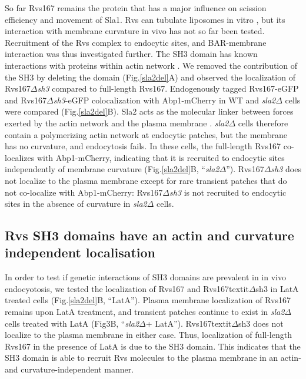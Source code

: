 \documentclass[9pt,lineno]{elife}
\begin{document}
So far Rvs167 remains the protein that has a major influence on scission efficiency and movement of Sla1. Rvs can tubulate liposomes in vitro \citep{Youn2010}, but its interaction with membrane curvature in vivo has not so far been tested.  Recruitment of the Rvs complex to endocytic sites, and BAR-membrane interaction was thus investigated further. The SH3 domain has known interactions with proteins within actin network \citep{Lila1997,Colwill1999,Madania1999,Liu2009}. We removed the contribution of the SH3 by deleting the domain (Fig.\ref{sla2del}A) and observed the localization of Rvs167\textit{$\Delta$sh3} compared to full-length Rvs167. Endogenously tagged Rvs167-eGFP and Rvs167\textit{$\Delta$sh3}-eGFP colocalization with Abp1-mCherry in WT and \textit{sla2$\Delta$} cells were compared (Fig.\ref{sla2del}B). Sla2 acts as the molecular linker between forces exerted by the actin network and the plasma membrane \citep{Skruzny2012}. \textit{sla2$\Delta$} cells therefore contain a polymerizing actin network at endocytic patches, but the membrane has no curvature, and endocytosis fails. In these cells, the full-length Rvs167 co-localizes with Abp1-mCherry, indicating that it is recruited to endocytic sites independently of membrane curvature (Fig.\ref{sla2del}B, “\textit{sla2$\Delta$}”). Rvs167\textit{$\Delta$sh3} does not localize to the plasma membrane except for rare transient patches that do not co-localize with Abp1-mCherry: Rvs167\textit{$\Delta$sh3} is not recruited to endocytic sites in the absence of curvature in \textit{sla2$\Delta$} cells.


\subsection{Rvs SH3 domains have an actin and curvature independent localisation}
In order to test if genetic interactions of SH3 domains are prevalent in in vivo endocyotosis, we tested the localization of Rvs167 and Rvs167textit{$\Delta$sh3} in LatA treated cells (Fig.\ref{sla2del}B, “LatA”). Plasma membrane localization of Rvs167 remains upon LatA treatment, and transient patches continue to exist in \textit{sla2$\Delta$} cells treated with LatA (Fig3B, “\textit{sla2$\Delta$}+ LatA”). Rvs167textit{$\Delta$sh3} does not localize to the plasma membrane in either case. Thus, localization of full-length Rvs167 in the presence of LatA is due to the SH3 domain. This indicates that the SH3 domain is able to recruit Rvs molecules to the plasma membrane in an actin- and curvature-independent manner. 
\end{document}
